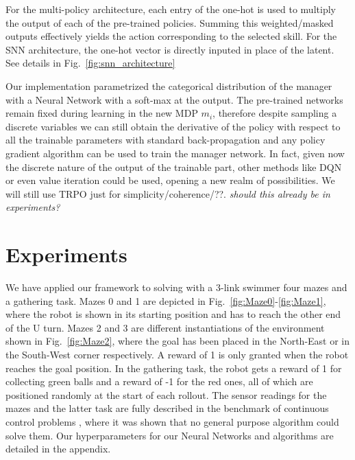 \documentclass{article} %
\begin{document}
For the multi-policy architecture, each entry of the one-hot is used to multiply the output of each of the pre-trained policies. Summing this weighted/masked outputs effectively yields the action corresponding to the selected skill. For the SNN architecture, the one-hot vector is directly inputed in place of the latent. See details in Fig.\ \ref{fig:snn_architecture}

Our implementation parametrized the categorical distribution of the manager with a Neural Network with a soft-max at the output. The pre-trained networks remain fixed during learning in the new MDP $m_i$, therefore despite sampling a discrete variables we can still obtain the derivative of the policy with respect to all the trainable parameters with standard back-propagation and any policy gradient algorithm can be used to train the manager network. In fact, given now the discrete nature of the output of the trainable part, other methods like DQN or even value iteration could be used, opening a new realm of possibilities. We will still use TRPO just for simplicity/coherence/??. \textit{should this already be in experiments?}


\section{Experiments}
We have applied our framework to solving with a 3-link swimmer four mazes and a gathering task. Mazes 0 and 1 are depicted in Fig.\ \ref{fig:Maze0}-\ref{fig:Maze1}, where the robot is shown in its starting position and has to reach the other end of the U turn. Mazes 2 and 3 are different instantiations of the environment shown in Fig.\ \ref{fig:Maze2}, where the goal has been placed in the North-East or in the South-West corner respectively. A reward of 1 is only granted when the robot reaches the goal position. In the gathering task, the robot gets a reward of 1 for collecting green balls and a reward of -1 for the red ones, all of which are positioned randomly at the start of each rollout. The sensor readings for the mazes and the latter task are fully described in the benchmark of continuous control problems \citep{duan2016benchmarking}, where it was shown that no general purpose algorithm could solve them. Our hyperparameters for our Neural Networks and algorithms are detailed in the appendix.
\end{document}
